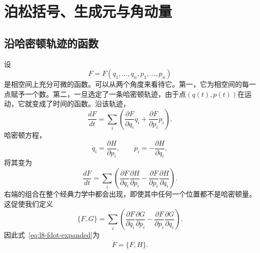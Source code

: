 \chapter{泊松括号、生成元与角动量}


\section{沿哈密顿轨迹的函数}

设
\[
  F=F(q_1,\ldots,q_n,p_1,\ldots,p_n)
\]
是相空间上充分可微的函数。可以从两个角度来看待它。第一，它为相空间的每一点赋予一个数。第二，一旦选定了一条哈密顿轨迹，由于点\((q(t),p(t))\)在运动，它就变成了时间的函数。沿该轨迹，
\begin{equation}
  \frac{dF}{dt}
  =
  \sum_i\left(
    \frac{\partial F}{\partial q_i}\dot q_i
    +\frac{\partial F}{\partial p_i}\dot p_i
  \right).
  \label{eq:l8-chain-rule}
\end{equation}
哈密顿方程，
\begin{equation}
  \dot q_i=\frac{\partial H}{\partial p_i},
  \qquad
  \dot p_i=-\frac{\partial H}{\partial q_i},
  \label{eq:l8-hamilton-equations}
\end{equation}
将其变为
\begin{equation}
  \frac{dF}{dt}
  =
  \sum_i\left(
    \frac{\partial F}{\partial q_i}
    \frac{\partial H}{\partial p_i}
    -
    \frac{\partial F}{\partial p_i}
    \frac{\partial H}{\partial q_i}
  \right).
  \label{eq:l8-fdot-expanded}
\end{equation}
右端的组合在整个经典力学中都会出现，即使其中任何一个位置都不是哈密顿量。这促使我们定义
\begin{equation}
  \boxed{
  \{F,G\}
  =
  \sum_i\left(
    \frac{\partial F}{\partial q_i}
    \frac{\partial G}{\partial p_i}
    -
    \frac{\partial F}{\partial p_i}
    \frac{\partial G}{\partial q_i}
  \right).}
  \label{eq:l8-poisson-definition}
\end{equation}
因此式~\eqref{eq:l8-fdot-expanded}为
\begin{equation}
  \boxed{\dot F=\{F,H\}.}
  \label{eq:l8-time-generator}
\end{equation}

